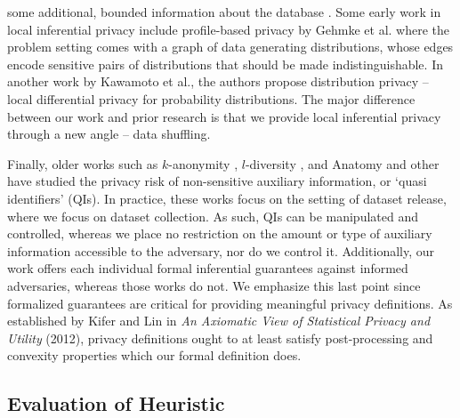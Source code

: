some additional, bounded information about the database 
\cite{bounded}. Some early work in local inferential privacy include profile-based privacy \cite{profile} by Gehmke et al. where the problem setting comes with a graph of data generating distributions, whose edges encode sensitive pairs of distributions that should be made indistinguishable. In another work by Kawamoto et al., the authors propose distribution privacy \cite{takao} -- local differential privacy for probability distributions.    The major difference between our work and prior research is that we provide local inferential privacy through a new angle -- data shuffling. 

Finally, older works such as $k$-anonymity \cite{kanon},  $l$-diversity \cite{ldiv}, and Anatomy \cite{anatomy} and other \cite{older1, older2, older3, older4, older5} have studied the privacy risk of non-sensitive auxiliary information, or `quasi identifiers' (QIs). In practice, these works focus on the setting of dataset release, where we focus on dataset collection. As such, QIs can be manipulated and controlled, whereas we place no restriction on the amount or type of auxiliary information accessible to the adversary, nor do we control it. Additionally, our work offers each individual formal inferential guarantees against informed adversaries, whereas those works do not. We emphasize this last point since formalized guarantees are critical for providing meaningful privacy definitions. As established by Kifer and Lin in \emph{An Axiomatic View of Statistical Privacy and Utility} (2012), privacy definitions ought to at least satisfy post-processing and convexity properties which our formal definition does.



 
\newpage


\subsection{Evaluation of Heuristic}
\label{apx:heuristic eval}

